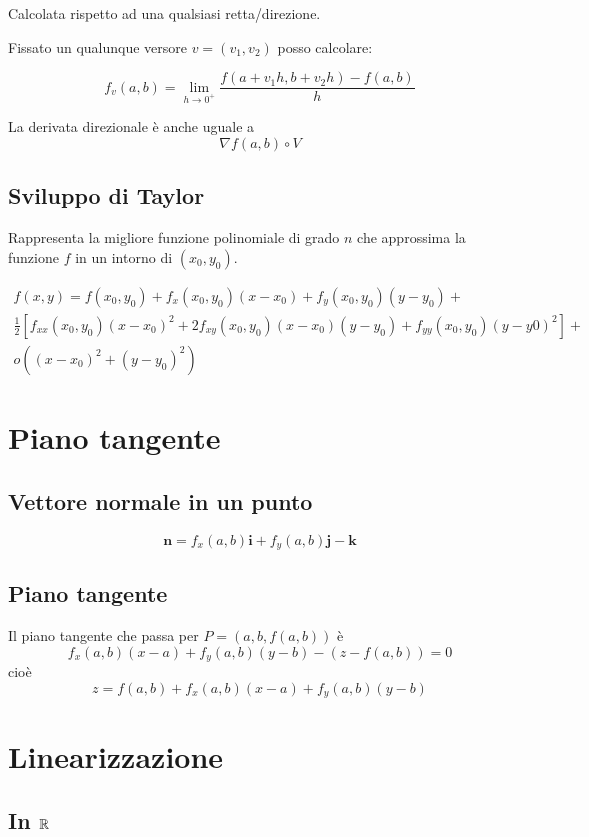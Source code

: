 Calcolata rispetto ad una qualsiasi retta/direzione.

Fissato un qualunque versore $v=(v_1,v_2)$ posso calcolare:

$$
f_v(a,b) = \lim_{h\to 0^+} \frac{f(a+v_1h,b+v_2h)-f(a,b)}{h}
$$

La derivata direzionale è anche uguale a $$\nabla f(a,b)\circ V$$

\subsection{Sviluppo di Taylor}

Rappresenta la migliore funzione polinomiale di grado $n$ che approssima la funzione $f$ in un intorno di $(x_0, y_0)$.

\begin{multline*}
f(x,y) = f(x_0,y_0)+f_x(x_0,y_0)(x-x_0)+f_y(x_0,y_0)(y-y_0)+ \\ \frac{1}{2} [f_{xx}(x_0,y_0)(x-x_0)^2+2f_{xy}(x_0,y_0)(x-x_0)(y-y_0)+f_{yy}(x_0,y_0)(y-y0)^2]+ \\ o((x-x_0)^2+(y-y_0)^2)
\end{multline*}

\section{Piano tangente}

\subsection{Vettore normale in un punto}

$$\mathbf{n} = f_x(a,b)\mathbf{i}+f_y(a,b)\mathbf{j}-\mathbf{k}$$

\subsection{Piano tangente}

Il piano tangente che passa per $P = (a,b,f(a,b))$ è $$f_x(a,b)(x-a)+f_y(a,b)(y-b)-(z-f(a,b))=0$$ cioè
$$z = f(a,b) + f_x(a,b)(x-a) + f_y(a,b)(y-b)$$

\section{Linearizzazione}

\subsection{In $\mathbb{R}$}

